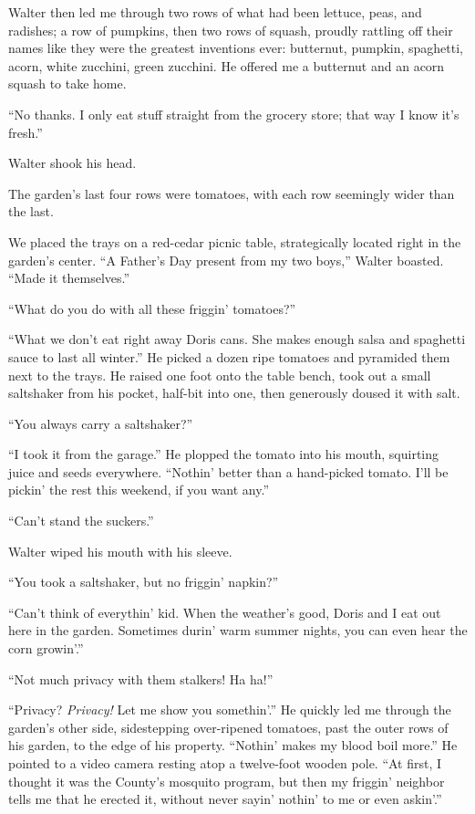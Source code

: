 Walter then led me through two rows of what had been lettuce, peas, and
radishes; a row of pumpkins, then two rows of squash, proudly rattling
off their names like they were the greatest inventions ever: butternut,
pumpkin, spaghetti, acorn, white zucchini, green zucchini. He offered me
a butternut and an acorn squash to take home.

``No thanks. I only eat stuff straight from the grocery store; that way
I know it's fresh.''

Walter shook his head.

The garden's last four rows were tomatoes, with each row seemingly wider
than the last.

We placed the trays on a red-cedar picnic table, strategically located
right in the garden's center. ``A Father's Day present from my two
boys,'' Walter boasted. ``Made it themselves.''

``What do you do with all these friggin' tomatoes?''

``What we don't eat right away Doris cans. She makes enough salsa and
spaghetti sauce to last all winter.'' He picked a dozen ripe tomatoes
and pyramided them next to the trays. He raised one foot onto the table
bench, took out a small saltshaker from his pocket, half-bit into one,
then generously doused it with salt.

``You always carry a saltshaker?''

``I took it from the garage.'' He plopped the tomato into his mouth,
squirting juice and seeds everywhere. ``Nothin' better than a
hand-picked tomato. I'll be pickin' the rest this weekend, if you want
any.''

``Can't stand the suckers.''

Walter wiped his mouth with his sleeve.

``You took a saltshaker, but no friggin' napkin?''

``Can't think of everythin' kid. When the weather's good, Doris and I
eat out here in the garden. Sometimes durin' warm summer nights, you can
even hear the corn growin'.''

``Not much privacy with them stalkers! Ha ha!''

``Privacy? \emph{Privacy!} Let me show you somethin'.'' He quickly led
me through the garden's other side, sidestepping over-ripened tomatoes,
past the outer rows of his garden, to the edge of his property.
``Nothin' makes my blood boil more.'' He pointed to a video camera
resting atop a twelve-foot wooden pole. ``At first, I thought it was the
County's mosquito program, but then my friggin' neighbor tells me that
he erected it, without never sayin' nothin' to me or even askin'.''

